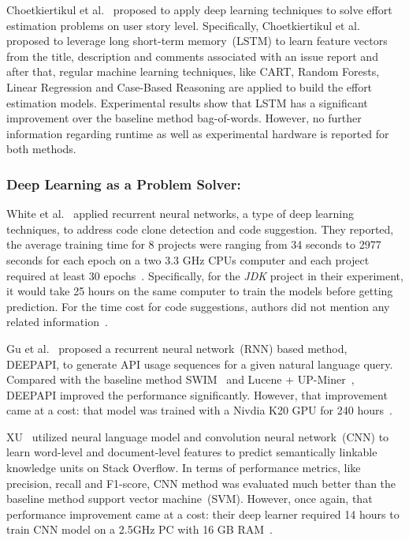 \documentclass[sigconf,review, anonymous]{acmart}
\theoremstyle{break}
\begin{document}
 Choetkiertikul et al.~\cite{choetkiertikul2016deep} proposed to apply deep learning techniques
 to solve effort estimation problems on user story level. 
 Specifically,  Choetkiertikul et al. ~\cite{choetkiertikul2016deep} proposed to leverage
 long short-term memory~(LSTM) to learn feature vectors from the title,
 description and comments associated with an issue report and after that,
 regular machine learning techniques, like CART, Random Forests, 
 Linear Regression and Case-Based Reasoning are applied to build the effort
 estimation models. Experimental results show that
 LSTM has a 
 significant improvement over the baseline method bag-of-words.
 However, no further information regarding
 runtime as well as experimental hardware  is reported for both methods.
 
 
\noindent
\subsubsection{Deep Learning as  a Problem Solver:}

 White et al.~\cite{white2015toward, white2016deep} applied
 recurrent neural networks, a type of  deep learning techniques, 
 to address code clone detection and code suggestion. They reported,
 the average training time for 8 projects were ranging from 34 seconds
  to 2977 seconds for each epoch on a two 3.3 GHz
 CPUs computer and each project required at least 30 epochs~\cite{white2016deep}.
Specifically, for the {\it JDK} project in their experiment, it would take 25 hours 
 on the same computer to train the models before getting prediction.
 For the time cost for code suggestions, authors did not mention any related information~\cite{white2015toward}.

Gu et al.~\cite{gu2016deep} proposed  a recurrent neural network~(RNN)
 based method, D{\scriptsize EEP}API, to generate API usage sequences for a given natural language query. 
 Compared with the baseline method { SWIM}~\cite{raghothaman2016swim} and 
 { Lucene + UP-Miner}~\cite{wang2013mining},  D{\scriptsize EEP}API   improved the performance significantly.
 However, that improvement came at a cost: that  model was trained with a Nivdia K20 GPU for  240 hours~\cite{gu2016deep}.
 
 XU~\cite{xu2016predicting} utilized neural language model and  
 convolution neural network~(CNN) to  learn word-level and document-level features to
 predict semantically linkable knowledge units on Stack Overflow. 
 In terms of performance metrics, like precision, recall and F1-score,
 CNN method was evaluated much better than 
 the baseline method support vector machine~(SVM). 
 However, once again, that performance improvement came at a cost:
 their deep learner required  
 14 hours to train CNN model on a 2.5GHz PC with 16 GB RAM~\cite{xu2016predicting}.
 
\end{document}
